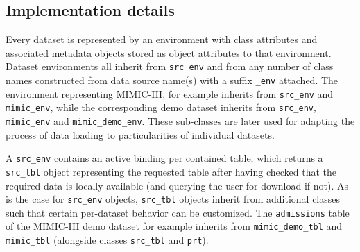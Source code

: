 \documentclass[
]{jss}
\begin{document}
\hypertarget{implementation-details}{%
\subsection{Implementation details}\label{implementation-details}}

Every dataset is represented by an environment with class attributes and
associated metadata objects stored as object attributes to that
environment. Dataset environments all inherit from \texttt{src\_env} and
from any number of class names constructed from data source name(s) with
a suffix \texttt{\_env} attached. The environment representing
MIMIC-III, for example inherits from \texttt{src\_env} and
\texttt{mimic\_env}, while the corresponding demo dataset inherits from
\texttt{src\_env}, \texttt{mimic\_env} and \texttt{mimic\_demo\_env}.
These sub-classes are later used for adapting the process of data
loading to particularities of individual datasets.

A \texttt{src\_env} contains an active binding per contained table,
which returns a \texttt{src\_tbl} object representing the requested
table after having checked that the required data is locally available
(and querying the user for download if not). As is the case for
\texttt{src\_env} objects, \texttt{src\_tbl} objects inherit from
additional classes such that certain per-dataset behavior can be
customized. The \texttt{admissions} table of the MIMIC-III demo dataset
for example inherits from \texttt{mimic\_demo\_tbl} and
\texttt{mimic\_tbl} (alongside classes \texttt{src\_tbl} and
\texttt{prt}).
\end{document}
